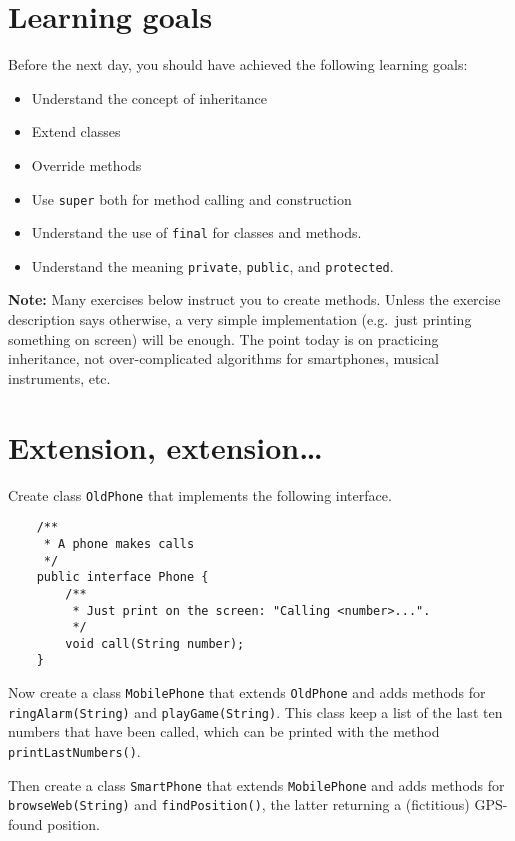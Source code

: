 \documentclass{article}
\begin{document}
\section*{Learning goals}
\label{sec:learning-goals}

Before the next day, you should have achieved the following learning
goals: 

\begin{itemize}
\item Understand the concept of inheritance
\item Extend classes
\item Override methods
\item Use \verb+super+ both for method calling and construction
\item Understand the use of \verb+final+ for classes and methods. 
\item Understand the meaning \verb+private+, \verb+public+, and \verb+protected+.
\end{itemize}

\textbf{Note:} Many exercises below instruct you to create methods. Unless the
exercise description says otherwise, a very simple implementation
(e.g.~just printing something on screen) will be enough. The point
today is on practicing inheritance, not over-complicated algorithms
for smartphones, musical instruments, etc. 

\section{Extension, extension\ldots}
\label{sec:extens-extens}

Create class \verb+OldPhone+ that implements the following interface. 

\begin{verbatim}
    /**
     * A phone makes calls
     */
    public interface Phone {
        /**
         * Just print on the screen: "Calling <number>...".
         */
        void call(String number);
    }
\end{verbatim}

Now create a class \verb+MobilePhone+ that extends \verb+OldPhone+ and
adds methods for \verb+ringAlarm(String)+ and
\verb+playGame(String)+. This class keep a list of the last
ten numbers that have been called, which can be printed with the
method \verb+printLastNumbers()+.

Then create a class \verb+SmartPhone+ that extends \verb+MobilePhone+
and adds methods for \verb+browseWeb(String)+ and
\verb+findPosition()+, the latter returning a (fictitious) GPS-found
position. 
\end{document}
